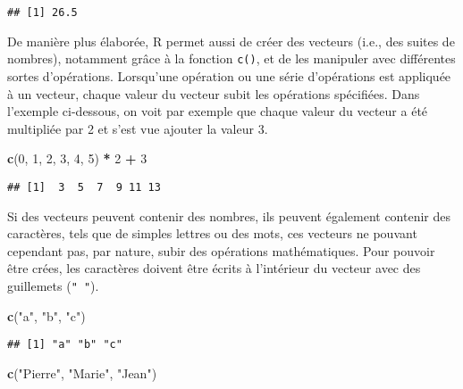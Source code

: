 \documentclass[
  french,
]{book}
\newenvironment{Shaded}{\begin{snugshade}}{\end{snugshade}}
\newcommand{\DecValTok}[1]{\textcolor[rgb]{0.00,0.00,0.81}{#1}}
\newcommand{\KeywordTok}[1]{\textcolor[rgb]{0.13,0.29,0.53}{\textbf{#1}}}
\newcommand{\NormalTok}[1]{#1}
\newcommand{\OperatorTok}[1]{\textcolor[rgb]{0.81,0.36,0.00}{\textbf{#1}}}
\newcommand{\StringTok}[1]{\textcolor[rgb]{0.31,0.60,0.02}{#1}}
\begin{document}
\begin{verbatim}
## [1] 26.5
\end{verbatim}

De manière plus élaborée, R permet aussi de créer des vecteurs (i.e., des suites de nombres), notamment grâce à la fonction \texttt{c()}, et de les manipuler avec différentes sortes d'opérations. Lorsqu'une opération ou une série d'opérations est appliquée à un vecteur, chaque valeur du vecteur subit les opérations spécifiées. Dans l'exemple ci-dessous, on voit par exemple que chaque valeur du vecteur a été multipliée par 2 et s'est vue ajouter la valeur 3.

\begin{Shaded}
\begin{Highlighting}[]
\KeywordTok{c}\NormalTok{(}\DecValTok{0}\NormalTok{, }\DecValTok{1}\NormalTok{, }\DecValTok{2}\NormalTok{, }\DecValTok{3}\NormalTok{, }\DecValTok{4}\NormalTok{, }\DecValTok{5}\NormalTok{) }\OperatorTok{*}\StringTok{ }\DecValTok{2} \OperatorTok{+}\StringTok{ }\DecValTok{3}
\end{Highlighting}
\end{Shaded}

\begin{verbatim}
## [1]  3  5  7  9 11 13
\end{verbatim}

Si des vecteurs peuvent contenir des nombres, ils peuvent également contenir des caractères, tels que de simples lettres ou des mots, ces vecteurs ne pouvant cependant pas, par nature, subir des opérations mathématiques. Pour pouvoir être crées, les caractères doivent être écrits à l'intérieur du vecteur avec des guillemets (\texttt{"\ "}).

\begin{Shaded}
\begin{Highlighting}[]
\KeywordTok{c}\NormalTok{(}\StringTok{"a"}\NormalTok{, }\StringTok{"b"}\NormalTok{, }\StringTok{"c"}\NormalTok{)}
\end{Highlighting}
\end{Shaded}

\begin{verbatim}
## [1] "a" "b" "c"
\end{verbatim}

\begin{Shaded}
\begin{Highlighting}[]
\KeywordTok{c}\NormalTok{(}\StringTok{"Pierre"}\NormalTok{, }\StringTok{"Marie"}\NormalTok{, }\StringTok{"Jean"}\NormalTok{)}
\end{Highlighting}
\end{Shaded}
\end{document}
